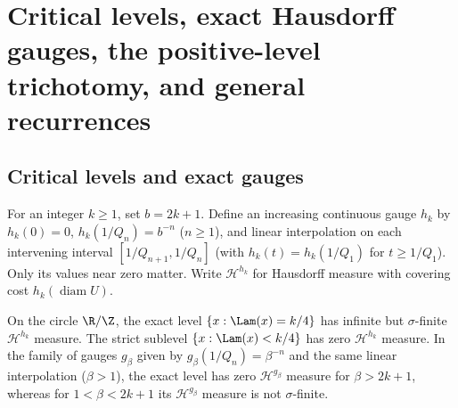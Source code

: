 \section{Critical levels, exact Hausdorff gauges, the positive-level trichotomy, and general recurrences}\label{sec:gauge}

\subsection{Critical levels and exact gauges}

For an integer $k\ge1$, set $b=2k+1$. Define an increasing continuous
gauge $h_k$ by $h_k(0)=0$, $h_k(1/Q_n)=b^{-n}$ ($n\ge1$), and
linear interpolation on each intervening interval $[1/Q_{n+1},1/Q_n]$ (with
$h_k(t)=h_k(1/Q_1)$ for $t\ge1/Q_1$). Only its values near zero matter. Write
$\mathcal H^{h_k}$ for Hausdorff measure with covering cost
$h_k(\operatorname{diam} U)$.

\begin{theorem}\label{thm:gauge}
On the circle $\R/\Z$, the exact level $\{x:\Lam(x)=k/4\}$ has
infinite but $\sigma$-finite $\mathcal H^{h_k}$ measure.
The strict sublevel $\{x:\Lam(x)<k/4\}$ has zero $\mathcal H^{h_k}$ measure.
In the family of gauges $g_\beta$ given by $g_\beta(1/Q_n)=\beta^{-n}$
and the same linear interpolation ($\beta>1$), the exact level has zero
$\mathcal H^{g_\beta}$ measure for $\beta>2k+1$, whereas for $1<\beta<2k+1$ its
$\mathcal H^{g_\beta}$ measure is not $\sigma$-finite.
\end{theorem}

